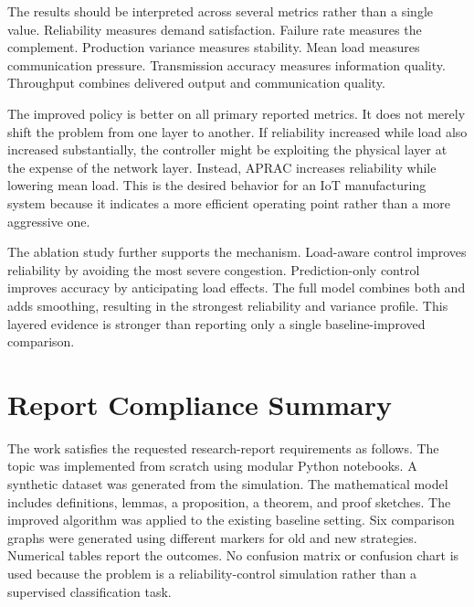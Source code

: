 \documentclass[journal]{IEEEtran}
\begin{document}
The results should be interpreted across several metrics rather than a single value. Reliability measures demand satisfaction. Failure rate measures the complement. Production variance measures stability. Mean load measures communication pressure. Transmission accuracy measures information quality. Throughput combines delivered output and communication quality.

The improved policy is better on all primary reported metrics. It does not merely shift the problem from one layer to another. If reliability increased while load also increased substantially, the controller might be exploiting the physical layer at the expense of the network layer. Instead, APRAC increases reliability while lowering mean load. This is the desired behavior for an IoT manufacturing system because it indicates a more efficient operating point rather than a more aggressive one.

The ablation study further supports the mechanism. Load-aware control improves reliability by avoiding the most severe congestion. Prediction-only control improves accuracy by anticipating load effects. The full model combines both and adds smoothing, resulting in the strongest reliability and variance profile. This layered evidence is stronger than reporting only a single baseline-improved comparison.

\section{Report Compliance Summary}

The work satisfies the requested research-report requirements as follows. The topic was implemented from scratch using modular Python notebooks. A synthetic dataset was generated from the simulation. The mathematical model includes definitions, lemmas, a proposition, a theorem, and proof sketches. The improved algorithm was applied to the existing baseline setting. Six comparison graphs were generated using different markers for old and new strategies. Numerical tables report the outcomes. No confusion matrix or confusion chart is used because the problem is a reliability-control simulation rather than a supervised classification task.



\end{document}
